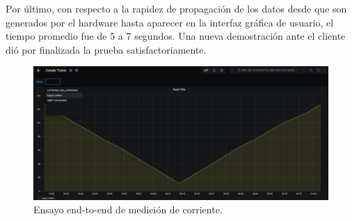 Por \'{u}ltimo, con respecto a la rapidez de propagaci\'{o}n de los datos desde que son generados por el hardware hasta aparecer en la interfaz gráfica de usuario, el tiempo promedio fue de 5 a 7 segundos. Una nueva demostraci\'{o}n ante el cliente di\'{o} por finalizada la prueba satisfactoriamente.
\vspace{200px}
\begin{figure}[h!]
	\centering
	\includegraphics[width=1.0\linewidth]{Figures/captura_historico_dropdown}
	\caption{Ensayo end-to-end de medici\'{o}n de corriente.}
	\label{fig:capturahistoricodropdown}
\end{figure}\\
